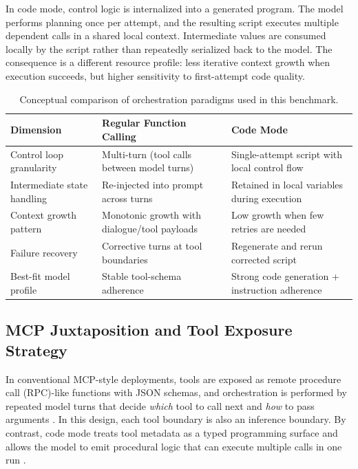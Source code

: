 \documentclass[journal,article,submit,pdftex,moreauthors]{Definitions/mdpi}
\begin{document}
In code mode, control logic is internalized into a generated program. The model performs planning once per attempt, and the resulting script executes multiple dependent calls in a shared local context. Intermediate values are consumed locally by the script rather than repeatedly serialized back to the model. The consequence is a different resource profile: less iterative context growth when execution succeeds, but higher sensitivity to first-attempt code quality.

\begin{table}[H]
\caption{Conceptual comparison of orchestration paradigms used in this benchmark.\label{tab:architecture_compare}}
\begin{tabularx}{\textwidth}{>{\RaggedRight\arraybackslash}X>{\RaggedRight\arraybackslash}X>{\RaggedRight\arraybackslash}X}
\toprule
\textbf{Dimension} & \textbf{Regular Function Calling} & \textbf{Code Mode}\\
\midrule
Control loop granularity & Multi-turn (tool calls between model turns) & Single-attempt script with local control flow\\
Intermediate state handling & Re-injected into prompt across turns & Retained in local variables during execution\\
Context growth pattern & Monotonic growth with dialogue/tool payloads & Low growth when few retries are needed\\
Failure recovery & Corrective turns at tool boundaries & Regenerate and rerun corrected script\\
Best-fit model profile & Stable tool-schema adherence & Strong code generation + instruction adherence\\
\bottomrule
\end{tabularx}
\end{table}

\subsection{MCP Juxtaposition and Tool Exposure Strategy}

In conventional MCP-style deployments, tools are exposed as remote procedure call (RPC)-like functions with JSON schemas, and orchestration is performed by repeated model turns that decide \emph{which} tool to call next and \emph{how} to pass arguments \cite{ref-mcp}. In this design, each tool boundary is also an inference boundary. By contrast, code mode treats tool metadata as a typed programming surface and allows the model to emit procedural logic that can execute multiple calls in one run \cite{ref-cf-codemode}. 
\end{document}
